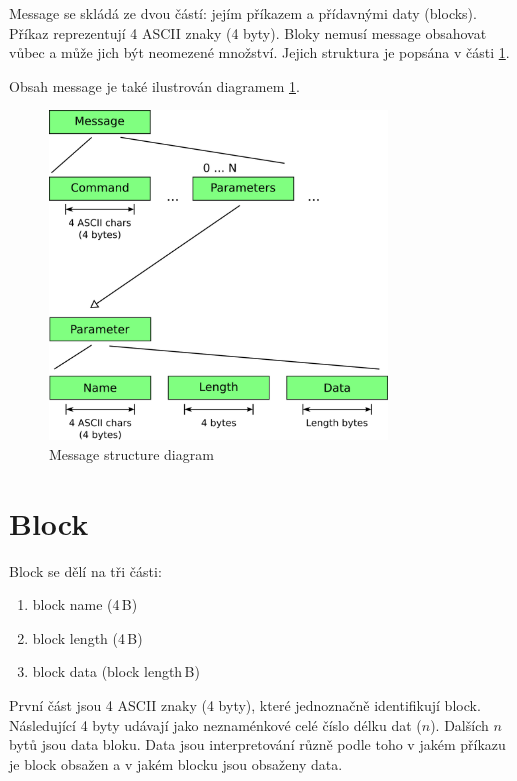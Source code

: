 \documentclass[12pt,oneside,a4paper]{report}
\begin{document}
Message se skládá ze dvou částí: jejím příkazem a přídavnými daty (blocks). Příkaz reprezentují 4 ASCII znaky (4 byty). Bloky nemusí message obsahovat vůbec a může jich být neomezené množství. Jejich struktura je popsána v části \ref{text.collab_message.block}.

Obsah message je také ilustrován diagramem \ref{picture.message_structure}.

\begin{figure}[h]
  \centering
  \includegraphics[width=0.80\textwidth]{diagrams/message_structure_diagram.png}
  \caption{Message structure diagram}
  \label{picture.message_structure}
\end{figure}

\section{Block}
\label{text.collab_message.block}

Block se dělí na tři části:

\begin{enumerate}
	\item block name (4\,{}B)
	\item block length (4\,{}B)
	\item block data (block length\,{}B)
\end{enumerate}

První část jsou 4 ASCII znaky (4 byty), které jednoznačně identifikují block. Následující 4 byty udávají jako neznaménkové celé číslo délku dat ($n$). Dalších $n$ bytů jsou data bloku. Data jsou interpretování různě podle toho v jakém příkazu je block obsažen a v jakém blocku jsou obsaženy data.
\end{document}
